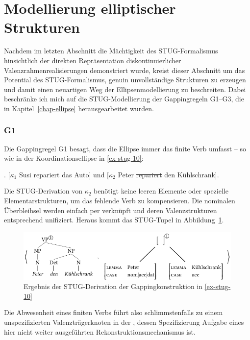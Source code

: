 \section{Modellierung elliptischer Strukturen} \label{sec-stug-ellipse}

Nachdem im letzten Abschnitt die Mächtigkeit des STUG-Formalismus hinsichtlich der direkten Repräsentation diskontinuierlicher Valenzrahmenrealisierungen demonstriert wurde, kreist dieser Abschnitt um das Potential des STUG-Formalismus, genuin unvollständige Strukturen zu erzeugen und damit einen neuartigen Weg der Ellipsenmodellierung zu beschreiten. Dabei beschränke ich mich auf die STUG-Modellierung der Gappingregeln G1--G3, die in Kapitel~\ref{chap-ellipse} herausgearbeitet wurden. 

\subsubsection*{G1}

Die Gappingregel G1 besagt, dass die Ellipse immer das finite Verb umfasst -- so wie in der Koordinationsellipse in \ref{ex-stug-10}:

\ex. \label{ex-stug-10} [$\kappa_1$ Susi repariert das Auto] und [$\kappa_2$ Peter \sout{repariert} den Kühlschrank]. 

Die STUG-Derivation von $\kappa_2$ benötigt keine leeren Elemente oder spezielle Elementarstrukturen, um das fehlende Verb zu kompensieren. Die nominalen Überbleibsel werden einfach per  verknüpft und deren Valenzstrukturen entsprechend unifiziert. Heraus kommt das STUG-Tupel in Abbildung~\ref{fig-stug-14}. 
\begin{figure}[t]
\centering
\includegraphics{graphics/abb914.pdf}
\caption{\label{fig-stug-14} Ergebnis der STUG-Derivation der Gappingkonstruktion in \ref{ex-stug-10}}
\end{figure}
Die Abwesenheit eines finiten Verbs führt also schlimmstenfalls zu einem unspezifizierten Valenzträgerknoten in der , dessen Spezifizierung Aufgabe eines hier nicht weiter ausgeführten Rekonstruktionsmechanismus ist. 


